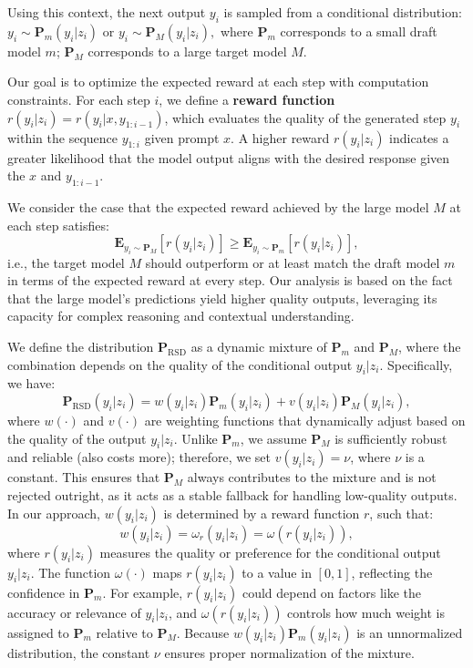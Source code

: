 \documentclass{article}
\theoremstyle{plain}
\theoremstyle{definition}
\theoremstyle{remark}
\begin{document}
Using this context, the next output \( y_i \) is sampled from a conditional distribution:
$
y_i \sim \mathbf{P}_m(y_i | z_i) \text{ or } y_i \sim \mathbf{P}_M(y_i | z_i),
$
where \( \mathbf{P}_m \) corresponds to a small draft model \( m \); \( \mathbf{P}_M \) corresponds to a large target model \( M \). %



Our goal is to optimize the expected reward at each step with computation constraints. For each step \( i \), we define a \textbf{reward function} \( r(y_i|z_i)= r( y_i|x,y_{1:i-1})  \), which evaluates the quality of the generated step \( y_i \) within the sequence \( y_{1:i} \) given prompt $x$. A higher reward \( r(y_i|z_i) \) indicates a greater likelihood that the model output aligns with the desired response given the \( x \) and \( y_{1:i-1} \).

We consider the case that the expected reward achieved by the large model \( M \) at each step satisfies:
\begin{equation}\label{eq:hypothesis}
    \mathbf{E}_{y_i \sim \mathbf{P}_M} \left[ r(y_i|z_i) \right] \geq \mathbf{E}_{y_i \sim \mathbf{P}_m} \left[ r(y_i|z_i) \right],
\end{equation}
i.e., the target model \( M \) should outperform or at least match the draft model \( m \) in terms of the expected reward at every step. Our analysis is based on the fact that the large model's predictions yield higher quality outputs, leveraging its capacity for complex reasoning and contextual understanding.

We define the distribution \(\mathbf{P}_{\text{RSD}}\) as a dynamic mixture of \(\mathbf{P}_m\) and \(\mathbf{P}_M\), where the combination depends on the quality of the conditional output \(y_i | z_i\). Specifically, we have:
\[
\mathbf{P}_{\text{RSD}}(y_i | z_i) 
= w(y_i | z_i) \mathbf{P}_m(y_i | z_i) + v(y_i | z_i) \mathbf{P}_M(y_i | z_i),
\]
where \(w(\cdot)\) and \(v(\cdot)\) are weighting functions that dynamically adjust based on the quality of the output \(y_i | z_i\). Unlike \(\mathbf{P}_m\), we assume \(\mathbf{P}_M\) is sufficiently robust and reliable (also costs more); therefore, we set \(v(y_i | z_i) = \nu\), where \(\nu\) is a constant. This ensures that \(\mathbf{P}_M\) always contributes to the mixture and is not rejected outright, as it acts as a stable fallback for handling low-quality outputs.
 In our approach, \(w(y_i | z_i)\) is determined by a reward function \(r\), such that:
\[
w(y_i | z_i) = \omega_r(y_i | z_i)= \omega(r(y_i | z_i)),
\]
where \(r(y_i | z_i)\) measures the quality or preference for the conditional output \(y_i | z_i\). The function \(\omega(\cdot)\) maps \(r(y_i | z_i)\) to a value in \([0, 1]\), reflecting the confidence in \(\mathbf{P}_m\). For example, \(r(y_i | z_i)\) could depend on factors like the accuracy or relevance of \(y_i | z_i\), and \(\omega(r(y_i | z_i))\) controls how much weight is assigned to \(\mathbf{P}_m\) relative to \(\mathbf{P}_M\). Because \(w(y_i | z_i) \mathbf{P}_m(y_i | z_i)\) is an unnormalized distribution, the constant \(\nu\) ensures proper normalization of the mixture.
\end{document}
